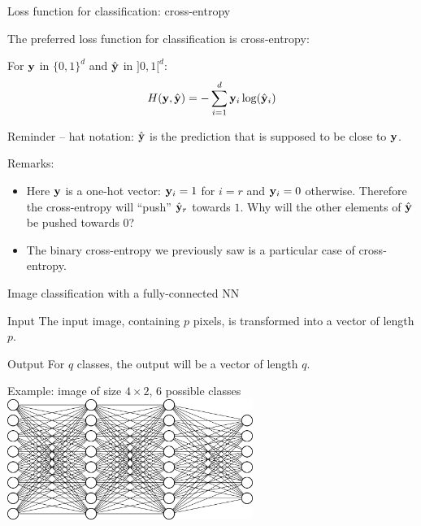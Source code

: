 \documentclass[xcolor=pdftex,dvipsnames,table,mathserif]{beamer}
\begin{document}
\begin{frame}{Loss function for classification: cross-entropy}

  The preferred loss function for classification is cross-entropy:

  \begin{block}{}
    For $\mathbf{y}$ in $\{0, 1\}^d$ and $\hat{\mathbf{y}}$ in $]0, 1[^d$:
    \[
    H(\mathbf{y}, \hat{\mathbf{y}}) = - \sum_{i=1}^d \mathbf{y}_i \log(\hat{\mathbf{y}}_i)
    \]

    \small
    Reminder -- hat notation: $\hat{\mathbf{y}}$ is the prediction that is supposed to be close to $\mathbf{y}$.
  \end{block}

  \pause

  Remarks:
  \begin{itemize}
  \item   Here $\mathbf{y}$ is a one-hot vector: $\mathbf{y}_i = 1$ for $i=r$ and $\mathbf{y}_i=0$ otherwise. Therefore the cross-entropy will ``push'' $\hat{\mathbf{y}}_r$ towards $1$. Why will the other elements of $\hat{\mathbf{y}}$ be pushed towards $0$?  \pause {}
    \pause
  \item   The binary cross-entropy we previously saw is a particular case of cross-entropy.

  \end{itemize}

\end{frame}

\begin{frame}{Image classification with a fully-connected NN}

  \begin{block}{Input}
    The input image, containing $p$ pixels, is transformed into a vector of length $p$.
  \end{block}

  \begin{block}{Output}
    For $q$ classes, the output will be a vector of length $q$.
  \end{block}

  \pause

  \begin{block}{Example: image of size $4 \times 2$, $6$ possible classes}
    \centering
    \includegraphics[width=0.6\textwidth]{mini_reseau3_bis}
  \end{block}

\end{frame}
\end{document}

